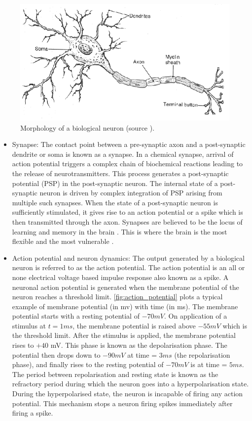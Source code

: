 \begin{figure}
	\centering
	\includegraphics[width=0.7\linewidth]{fig/snn/biological_neuron.png}
	\caption{Morphology of a biological neuron (source \citet{carlson1967foundations}).}
	\label{fig:biological_neuron}
\end{figure}
\begin{itemize}
	\item Synapse: The contact point between a pre-synaptic axon and a post-synaptic dendrite or soma is known as a synapse. In a chemical synapse, arrival of action potential triggers a complex chain of biochemical reactions leading to the release of neurotransmitters. This process generates a post-synaptic potential (PSP) in the post-synaptic neuron. The internal state of a post-synaptic neuron is driven by complex integration of PSP arising from multiple such synapses. When the state of a post-synaptic neuron is sufficiently stimulated, it gives rise to an action potential or a spike which is then transmitted through the axon. Synapses are believed to be the locus of learning and memory in the brain \citep{squire1999memory}. This is where the brain is the most flexible and the most vulnerable \citep{marian2002biologically}.
	
	\item Action potential and neuron dynamics: The output generated by a biological neuron is referred to as the action potential. The action potential is an all or none electrical voltage based impulse response \citep{aur2010neuroelectrodynamics} also known as a spike. A neuronal action potential is generated when the membrane potential of the neuron reaches a threshold limit. \figurename \ref{fig:action_potential} plots a typical example of membrane potential (in mv) with time (in ms). The membrane potential starts with a resting potential of $-70 mV$. On application of a stimulus at $t=1 ms$, the membrane potential is raised above $-55 mV$ which is the threshold limit. After the stimulus is applied, the membrane potential rises to $+40$ mV. This phase is known as the depolarisation phase. The potential then drops down to $-90 mV$ at time = $3 ms$ (the repolarisation phase), and finally rises to the resting potential of $-70 mV$ is  at time = $5 ms$. The period between repolarisation and resting state is known as the refractory period during which the neuron goes into a hyperpolarisation state. During the hyperpolarised state, the neuron is incapable of firing any action potential. This mechanism stops a neuron firing spikes immediately after firing a spike.
\end{itemize}


